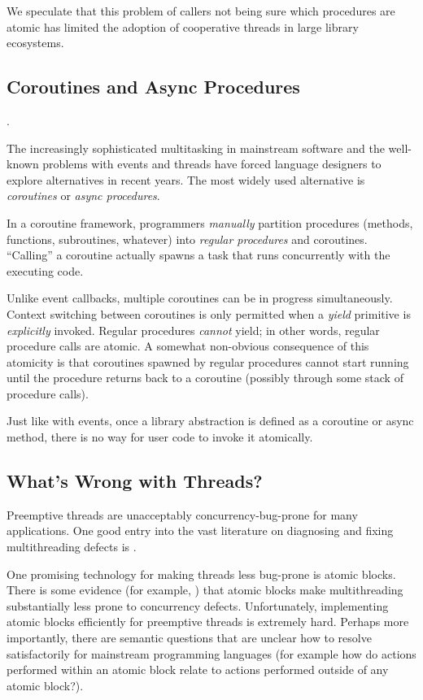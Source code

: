 \documentclass[a4paper,UKenglish,cleveref, autoref]{lipics-v2019}
\begin{document}
We speculate that this problem of callers not being sure which procedures are atomic has limited the adoption of cooperative threads in large library ecosystems.

\subsection{Coroutines and Async Procedures}.

The increasingly sophisticated multitasking in mainstream software and the well-known problems with events and threads have forced language designers to explore alternatives in recent years.
The most widely used alternative is \emph{coroutines} or \emph{async procedures}\footnotemark{}.


In a coroutine framework, programmers \emph{manually} partition procedures (methods, functions, subroutines, whatever) into \emph{regular procedures} and coroutines.
``Calling'' a coroutine actually spawns a task that runs concurrently with the executing code.

Unlike event callbacks, multiple coroutines can be in progress simultaneously.
Context switching between coroutines is only permitted when a \emph{yield} primitive is \emph{explicitly} invoked.
Regular procedures \emph{cannot} yield; in other words, regular procedure calls are atomic.
A somewhat non-obvious consequence of this atomicity is that coroutines spawned by regular procedures cannot start running until the procedure returns back to a coroutine (possibly through some stack of procedure calls).

Just like with events, once a library abstraction is defined as a coroutine or async method, there is no way for user code to invoke it atomically.

\subsection{What's Wrong with Threads?}

Preemptive threads are unacceptably concurrency-bug-prone for many applications.
One good entry into the vast literature on diagnosing and fixing multithreading defects is \cite{Lu2008}.

One promising technology for making threads less bug-prone is atomic blocks.
There is some evidence (for example, \cite{Harris2005, Grossman2007, Pankratius2014}) that atomic blocks make multithreading substantially less prone to concurrency defects.
Unfortunately, implementing atomic blocks efficiently for preemptive threads is extremely hard.
Perhaps more importantly, there are semantic questions that are unclear how to resolve satisfactorily for mainstream programming languages (for example how do actions performed within an atomic block relate to actions performed outside of any atomic block?).
\end{document}
